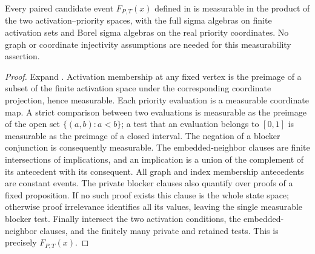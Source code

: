 \begin{helper}
Every paired candidate event \(F_{P,T}(x)\) defined in
 is measurable
in the product of the two activation--priority spaces, with the full
sigma algebras on finite activation sets and Borel sigma algebras on
the real priority coordinates. No graph or coordinate injectivity
assumptions are needed for this measurability assertion.
\end{helper}
\begin{proof}
Expand .
Activation membership at any fixed vertex is the preimage of a subset
of the finite activation space under the corresponding coordinate
projection, hence measurable. Each priority evaluation is a measurable
coordinate map. A strict comparison between two evaluations is measurable
as the preimage of the open set \(\{(a,b):a<b\}\); a test that an
evaluation belongs to \([0,1]\) is measurable as the preimage of a closed
interval. The negation of a blocker conjunction is consequently measurable.
The embedded-neighbor clauses are finite intersections of implications,
and an implication is a union of the complement of its antecedent with its
consequent. All graph and index membership antecedents are constant events.
The private blocker clauses also quantify over proofs of a fixed
proposition. If no such proof exists this clause is the whole state space;
otherwise proof irrelevance identifies all its values, leaving the single
measurable blocker test. Finally intersect the two activation conditions,
the embedded-neighbor clauses, and the finitely many private and retained
tests. This is precisely \(F_{P,T}(x)\).
\end{proof}
